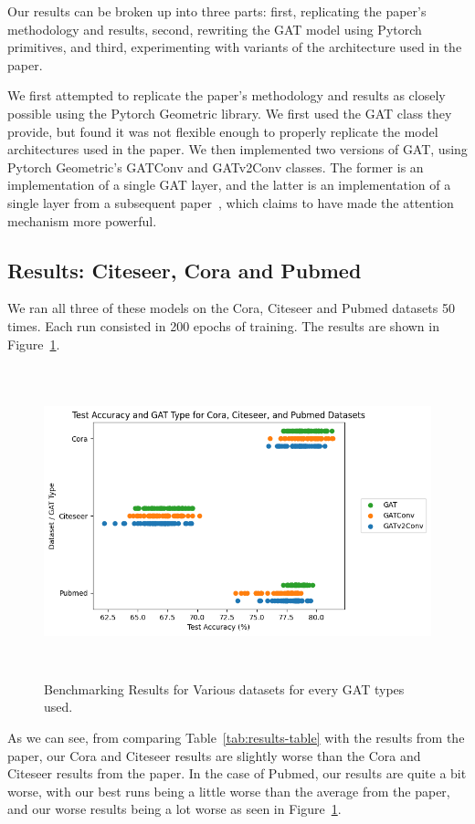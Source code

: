 Our results can be broken up into three parts: first, replicating the paper's
methodology and results, second, rewriting the GAT model using Pytorch
primitives, and third, experimenting with variants of the architecture used in
the paper.

We first attempted to replicate the paper's methodology and results as closely
possible using the Pytorch Geometric library. We first used the GAT class they
provide, but found it was not flexible enough to properly replicate the model
architectures used in the paper. We then implemented two versions of GAT, using
Pytorch Geometric's GATConv and GATv2Conv classes. The former is an
implementation of a single GAT layer, and the latter is an implementation of
a single layer from a subsequent paper~\cite{velivckovic2021attentive},
which claims to have made the attention mechanism more powerful.

\subsection{Results: Citeseer, Cora and Pubmed}\label{subsec:results:-citeseer-cora-and-pubmed}
We ran all three of these models on the Cora, Citeseer and Pubmed datasets 50
times. Each run consisted in 200 epochs of training. The results are shown in Figure~\ref{fig:benchmarks}.

\begin{figure}
    \includegraphics[width=\textwidth, height=9cm]{images/Benchmarking_Result_Graph}
    \caption{Benchmarking Results for Various datasets for every GAT types used.}
    \label{fig:benchmarks}
\end{figure}
As we can see, from comparing Table~\ref{tab:results-table} with the results from the paper,
our Cora and Citeseer results are slightly worse than the Cora and Citeseer results from the paper.
In the case of Pubmed, our results are quite a bit worse, with our best runs being
a little worse than the average from the paper, and our worse results being
a lot worse as seen in Figure~\ref{fig:benchmarks}.

